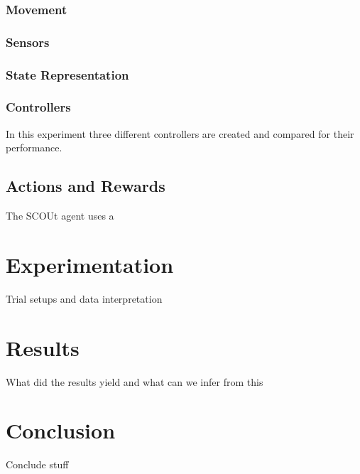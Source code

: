 \documentclass[]{report}
\begin{document}
\subsubsection{Movement}

\subsubsection{Sensors}

\subsubsection{State Representation}

\subsubsection{Controllers}
In this experiment three different controllers are created and compared for their performance.


\subsection{Actions and Rewards}
The SCOUt agent uses a



\section{Experimentation}
Trial setups and data interpretation



\section{Results}
What did the results yield and what can we infer from this



\section{Conclusion}
Conclude stuff
\end{document}
